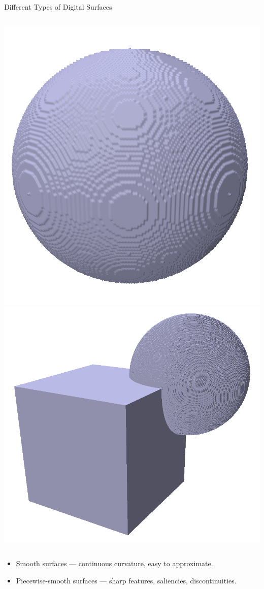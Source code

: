 \documentclass[11pt]{beamer}
\begin{document}
    \begin{frame}{Different Types of Digital Surfaces}
        \begin{columns}
            \includegraphics[width=\linewidth]{pictures/smooth_surface}
            \includegraphics[width=\linewidth]{pictures/piecewise_smooth}
        \end{columns}
        \vspace{0.3cm}
        \begin{itemize}
            \item Smooth surfaces — continuous curvature, easy to approximate.
            \item Piecewise-smooth surfaces — sharp features, saliencies, discontinuities.
        \end{itemize}
    \end{frame}
\end{document}
